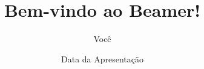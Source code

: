 \documentclass{beamer}
\title{Bem-vindo ao Beamer!}
\author{Você}
\institute{De onde você é?}
\date{Data da Apresentação}
\begin{document}
\begin{frame}
\titlepage %
\end{frame}
\end{document}
